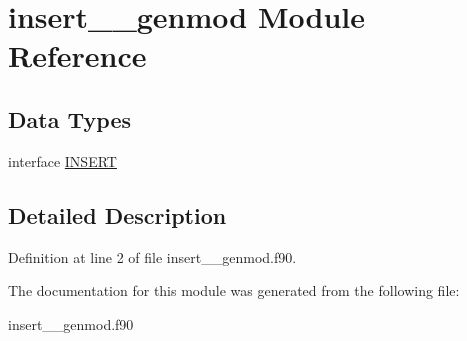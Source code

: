 \hypertarget{classinsert____genmod}{\section{insert\+\_\+\+\_\+genmod Module Reference}
\label{classinsert____genmod}
}
\subsection*{Data Types}
\begin{DoxyCompactItemize}
\item 
interface \hyperlink{interfaceinsert____genmod_1_1_i_n_s_e_r_t}{I\+N\+S\+E\+R\+T}
\end{DoxyCompactItemize}


\subsection{Detailed Description}


Definition at line 2 of file insert\+\_\+\+\_\+genmod.\+f90.



The documentation for this module was generated from the following file\+:\begin{DoxyCompactItemize}
\item 
insert\+\_\+\+\_\+genmod.\+f90\end{DoxyCompactItemize}
